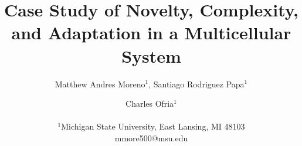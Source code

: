 \documentclass[letterpaper]{article}
\title{Case Study of Novelty, Complexity, and Adaptation in a Multicellular System}
\author{Matthew Andres Moreno$^{1}$, Santiago Rodriguez Papa$^{1}$ \and Charles Ofria$^{1}$ \\
\mbox{}\\
$^1$Michigan State University, East Lansing, MI 48103 \\
mmore500@msu.edu} %
\begin{document}
\maketitle















\footnotesize


\clearpage
\newpage

\appendix


\end{document}
